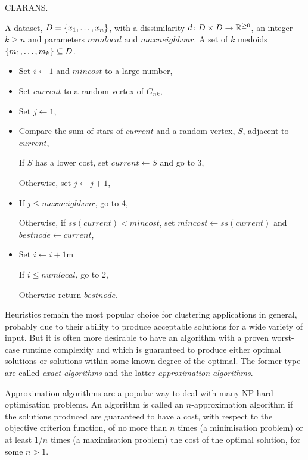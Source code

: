 \begin{algorithm}[h]
  \caption{CLARANS.}
  \label{alg:clarans}
  \begin{algorithmic}
    \Require A dataset, $D = \{x_1,\dotsc,x_n\}$, with a dissimilarity $d
             \colon D \times D \to \mathbb{R}^{\geq 0}$, an integer
             $k \geq n$ and parameters $numlocal$ and $maxneighbour$.
    \Ensure  A set of $k$ medoids $\{m_1,\dotsc,m_k\}\subseteq D$.
    \begin{itemize}
    \item Set $i \gets 1$ and $mincost$ to a large number,
    \item Set $current$ to a random vertex of $G_{nk}$,
    \item Set $j \gets 1$,
    \item Compare the sum-of-stars of $current$ and a random vertex, $S$,
      adjacent to $current$,

      If $S$ has a lower cost, set $current \gets S$ and go to 3,

      Otherwise, set $j \gets j+1$,
    \item If $j \leq maxneighbour$, go to 4,

      Otherwise, if $ss(current)<mincost$, set $mincost \gets ss(current)$ and
      $bestnode \gets current$,
    \item Set $i \gets i+1$m

      If $i \leq numlocal$, go to 2,
  
      Otherwise return $bestnode$.
    \end{itemize}
  \end{algorithmic}

\end{algorithm}

\noindent Heuristics remain the most popular choice for clustering
applications in general, probably due to their ability to produce acceptable
solutions for a wide variety of input.  But it is often more desirable to have
an algorithm with a proven worst-case runtime complexity and which is
guaranteed to produce either optimal solutions or solutions within some known
degree of the optimal.  The former type are called \textit{exact algorithms}
and the latter \textit{approximation algorithms}.

Approximation algorithms are a popular way to deal with many NP-hard
optimisation problems.  An algorithm is called an $n$-approximation algorithm
if the solutions produced are guaranteed to have a cost, with respect to the
objective criterion function, of no more than $n$ times (a minimisation
problem) or at least $1/n$ times (a maximisation problem) the cost of the
optimal solution, for some $n > 1$.

